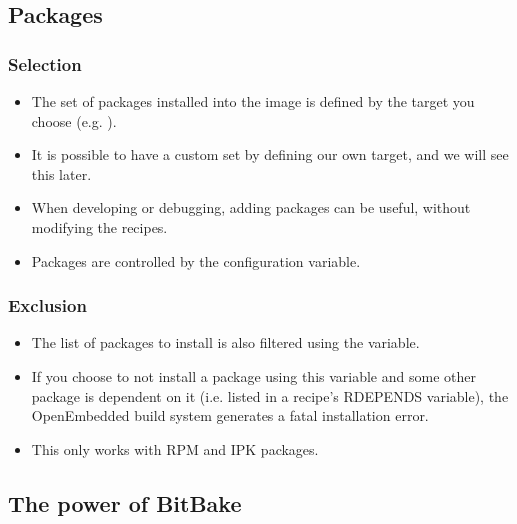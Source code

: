 \subsection{Packages}

\begin{frame}
  \frametitle{Selection}
  \begin{itemize}
    \item The set of packages installed into the image is defined by
      the target you choose (e.g. ).
    \item It is possible to have a custom set by defining our own
      target, and we will see this later.
    \item When developing or debugging, adding packages can be useful,
      without modifying the recipes.
    \item Packages are controlled by the 
      configuration variable.
  \end{itemize}
\end{frame}

\begin{frame}
  \frametitle{Exclusion}
  \begin{itemize}
    \item The list of packages to install is also filtered using the
       variable.
    \item If you choose to not install a package using this variable
      and some other package is dependent on it (i.e. listed in a
      recipe's RDEPENDS variable), the OpenEmbedded build system
      generates a fatal installation error.
    \item This only works with RPM and IPK packages.
  \end{itemize}
\end{frame}

\subsection{The power of BitBake}

